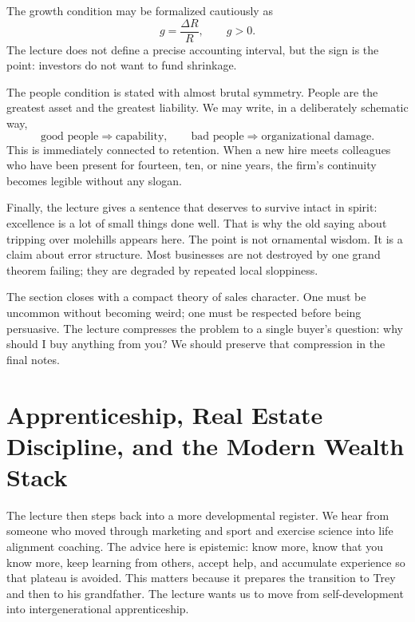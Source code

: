 The growth condition may be formalized cautiously as
\begin{equation}
g = \frac{\Delta R}{R},
\qquad
g>0.
\end{equation}
The lecture does not define a precise accounting interval, but the sign is the point: investors do not want to fund shrinkage.

The people condition is stated with almost brutal symmetry. People are the greatest asset and the greatest liability. We may write, in a deliberately schematic way,
\begin{equation}
\text{good people} \Rightarrow \text{capability},
\qquad
\text{bad people} \Rightarrow \text{organizational damage}.
\end{equation}
This is immediately connected to retention. When a new hire meets colleagues who have been present for fourteen, ten, or nine years, the firm's continuity becomes legible without any slogan.

Finally, the lecture gives a sentence that deserves to survive intact in spirit: excellence is a lot of small things done well. That is why the old saying about tripping over molehills appears here. The point is not ornamental wisdom. It is a claim about error structure. Most businesses are not destroyed by one grand theorem failing; they are degraded by repeated local sloppiness.

The section closes with a compact theory of sales character. One must be uncommon without becoming weird; one must be respected before being persuasive. The lecture compresses the problem to a single buyer's question: why should I buy anything from you? We should preserve that compression in the final notes.

\section{Apprenticeship, Real Estate Discipline, and the Modern Wealth Stack}

The lecture then steps back into a more developmental register. We hear from someone who moved through marketing and sport and exercise science into life alignment coaching. The advice here is epistemic: know more, know that you know more, keep learning from others, accept help, and accumulate experience so that plateau is avoided. This matters because it prepares the transition to Trey and then to his grandfather. The lecture wants us to move from self-development into intergenerational apprenticeship.

